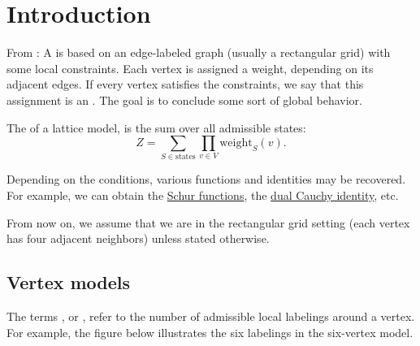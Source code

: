 
\section[latticeModel]{Introduction}

From \cite{Karhadkar2022x}: A  is based on an edge-labeled graph 
(usually a rectangular grid) with some local constraints. 
Each vertex is assigned a weight, depending on its adjacent edges. 
If every vertex satisfies the constraints, we say that this assignment is an .
The goal is to conclude some sort of global behavior.

The  of a lattice model, is the sum over all admissible states:
\[
 Z = \sum_{S \in \mathrm{ states}} \prod_{v \in V} \mathrm{weight}_S(v).
\]

Depending on the conditions, various functions and identities may be recovered.
For example, we can obtain the \hyperref[schurS]{Schur functions},
the \hyperref[schurCauchyFormula]{dual Cauchy identity}, etc.

From now on, we assume that we are in the rectangular grid 
setting (each vertex has four adjacent neighbors) unless stated otherwise.

\subsection[latticeModelVertex]{Vertex models}


The terms ,  or ,
refer to the number of admissible local labelings around a vertex.
For example, the figure below illustrates the six labelings in the six-vertex model.
\begin{figure}
\end{figure}

